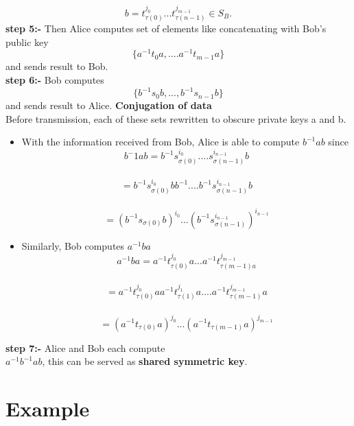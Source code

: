 \documentclass[12pt]{article}
\begin{document}
      $$b=t^{j_0}_{\tau(0)}...t^{j_{m-1}}_{\tau(n-1)} \in S_B.$$
       \textbf{step 5:-} Then Alice computes set of elements like concatenating with Bob's public key \\
      $$\{a^{-1}t_{0}a,....a^{-1}t_{m-1}a\}$$ 
      and sends result to Bob.\\
      \textbf{step 6:-} Bob computes \\
      $$\{b^{-1}s_0b,...,b^{-1}s_{n-1}b\}$$
      and sends result to Alice.
      \textbf{Conjugation of data}\\
      Before transmission, each of these sets rewritten to obscure private keys a and b.\\
     \begin{itemize}
         \item  With the information received from Bob, Alice is able to compute $b^{-1}ab$ since\\
      $$b^-1ab=b^{-1}s^{i_0}_{\sigma(0)}....s^{i_{n-1}}_{\sigma(n-1)}b$$\\
              $$=b^{-1}s^{i_0}_{\sigma(0)}bb^{-1}....b^{-1}s^{i_{n-1}}_{\sigma(n-1)}b$$\\
              $$=(b^{-1}s_{\sigma(0)}b)^{i_0}...(b^{-1}s^{i_{n-1}}_{\sigma(n-1)})^{i_{n-1}}$$
     \end{itemize}
     \begin{itemize}
          \item Similarly, Bob computes $a^{-1}ba$ \\
          $$a^{-1}ba=a^{-1}t^{j_0}_{\tau(0)}a...a^{-1}t^{j_{m-1}}_{\tau(m-1)a}$$\\
          $$=a^{-1}t^{j_0}_{\tau(0)}aa^{-1}t^{j_1}_{\tau(1)}a....a^{-1}t^{j_{m-1}}_{\tau(m-1)}a$$\\
          $$=(a^{-1}t_{\tau(0)}a)^{j_0}...(a^{-1}t_{\tau(m-1)}a)^{j_{m-1}}$$
      \end{itemize}
      \textbf{step 7:-} Alice and Bob each compute \\
     $a^{-1}b^{-1}ab$, this can be served as \textbf{shared symmetric key}\cite{stamp2007applied}.
     \pagebreak
     \section{Example}
     
\end{document}
